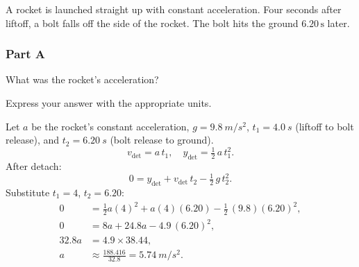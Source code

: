 A rocket is launched straight up with constant acceleration. Four seconds after liftoff, a bolt falls off the side of the rocket. The bolt hits the ground \(6.20\,\mathrm{s}\) later.

\subsubsection{Part A}
What was the rocket's acceleration?

Express your answer with the appropriate units.

\begin{solution}
Let \(a\) be the rocket's constant acceleration, \(g=\SI{9.8}{m/s^2}\), \(t_1=\SI{4.0}{s}\) (liftoff to bolt release), and \(t_2=\SI{6.20}{s}\) (bolt release to ground).
\[
    v_{\mathrm{det}} = a\,t_1,\quad y_{\mathrm{det}} = \tfrac12\,a\,t_1^2.
\]
After detach:
\[
    0 = y_{\mathrm{det}} + v_{\mathrm{det}}\,t_2 - \tfrac12\,g\,t_2^2.
\]
Substitute \(t_1=4\), \(t_2=6.20\):
\begin{align*}
    0 &= \tfrac12 a(4)^2 + a(4)(6.20) - \tfrac12\,(9.8)(6.20)^2,\\
    0 &= 8a + 24.8a - 4.9\,(6.20)^2,\\
    32.8a &= 4.9\times38.44,\\
    a &\approx \frac{188.416}{32.8} = \SI{5.74}{m/s^2}.
\end{align*}
\end{solution}

